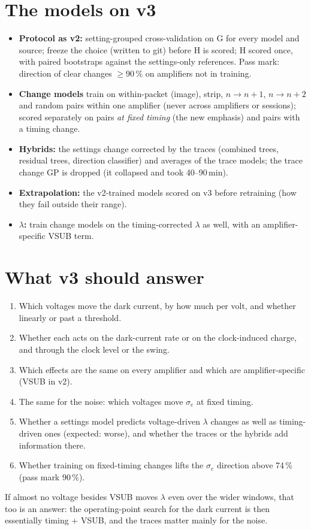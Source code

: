 \documentclass[11pt]{article}
\begin{document}
\section{The models on v3}
\begin{itemize}
\item \textbf{Protocol as v2:} setting-grouped cross-validation on G for every model and source; freeze the choice
  (written to git) before H is scored; H scored once, with paired bootstraps against the settings-only references.
  Pass mark: direction of clear changes $\geq 90$\,\% on amplifiers not in training.
\item \textbf{Change models} train on within-packet (image), strip, $n \to n{+}1$, $n \to n{+}2$ and random pairs within
  one amplifier (never across amplifiers or sessions); scored separately on pairs \emph{at fixed timing} (the new
  emphasis) and pairs with a timing change.
\item \textbf{Hybrids:} the settings change corrected by the traces (combined trees, residual trees, direction
  classifier) and averages of the trace models; the trace change GP is dropped (it collapsed and took 40--90\,min).
\item \textbf{Extrapolation:} the v2-trained models scored on v3 before retraining (how they fail outside their range).
\item \textbf{$\lambda$:} train change models on the timing-corrected $\lambda$ as well, with an amplifier-specific VSUB term.
\end{itemize}

\section{What v3 should answer}
\begin{enumerate}
\item Which voltages move the dark current, by how much per volt, and whether linearly or past a threshold.
\item Whether each acts on the dark-current rate or on the clock-induced charge, and through the clock level or the swing.
\item Which effects are the same on every amplifier and which are amplifier-specific (VSUB in v2).
\item The same for the noise: which voltages move $\sigma_e$ at fixed timing.
\item Whether a settings model predicts voltage-driven $\lambda$ changes as well as timing-driven ones (expected: worse),
  and whether the traces or the hybrids add information there.
\item Whether training on fixed-timing changes lifts the $\sigma_e$ direction above 74\,\% (pass mark 90\,\%).
\end{enumerate}
If almost no voltage besides VSUB moves $\lambda$ even over the wider windows, that too is an answer: the operating-point
search for the dark current is then essentially timing + VSUB, and the traces matter mainly for the noise.
\end{document}
